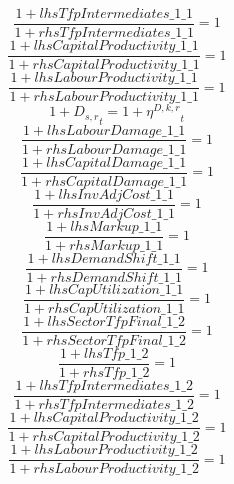 \begin{dmath}
\frac{1+{lhsTfpIntermediates\_1\_1}}{1+{rhsTfpIntermediates\_1\_1}}=1
\end{dmath}
\begin{dmath}
\frac{1+{lhsCapitalProductivity\_1\_1}}{1+{rhsCapitalProductivity\_1\_1}}=1
\end{dmath}
\begin{dmath}
\frac{1+{lhsLabourProductivity\_1\_1}}{1+{rhsLabourProductivity\_1\_1}}=1
\end{dmath}
\begin{dmath}
1+{{D_{s,r}}}_{t}=1+{{\eta^{D,k,r}}}_{t}
\end{dmath}
\begin{dmath}
\frac{1+{lhsLabourDamage\_1\_1}}{1+{rhsLabourDamage\_1\_1}}=1
\end{dmath}
\begin{dmath}
\frac{1+{lhsCapitalDamage\_1\_1}}{1+{rhsCapitalDamage\_1\_1}}=1
\end{dmath}
\begin{dmath}
\frac{1+{lhsInvAdjCost\_1\_1}}{1+{rhsInvAdjCost\_1\_1}}=1
\end{dmath}
\begin{dmath}
\frac{1+{lhsMarkup\_1\_1}}{1+{rhsMarkup\_1\_1}}=1
\end{dmath}
\begin{dmath}
\frac{1+{lhsDemandShift\_1\_1}}{1+{rhsDemandShift\_1\_1}}=1
\end{dmath}
\begin{dmath}
\frac{1+{lhsCapUtilization\_1\_1}}{1+{rhsCapUtilization\_1\_1}}=1
\end{dmath}
\begin{dmath}
\frac{1+{lhsSectorTfpFinal\_1\_2}}{1+{rhsSectorTfpFinal\_1\_2}}=1
\end{dmath}
\begin{dmath}
\frac{1+{lhsTfp\_1\_2}}{1+{rhsTfp\_1\_2}}=1
\end{dmath}
\begin{dmath}
\frac{1+{lhsTfpIntermediates\_1\_2}}{1+{rhsTfpIntermediates\_1\_2}}=1
\end{dmath}
\begin{dmath}
\frac{1+{lhsCapitalProductivity\_1\_2}}{1+{rhsCapitalProductivity\_1\_2}}=1
\end{dmath}
\begin{dmath}
\frac{1+{lhsLabourProductivity\_1\_2}}{1+{rhsLabourProductivity\_1\_2}}=1
\end{dmath}
